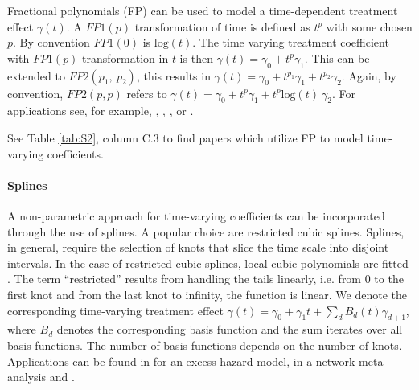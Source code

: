 
\noindent Fractional polynomials (FP) can be used to model a time-dependent treatment effect $\gamma \left(t\right)$. A $FP1(p)$ transformation of time is defined as $t^p$ with some chosen $p$. By convention $FP1(0)$ is $\mathrm{log}\mathrm{}(t)$. The time varying treatment coefficient with $FP1(p)$ transformation in $t$ is then $\gamma \left(t\right)={\gamma }_0+t^p{\gamma }_1$. This can be extended to $FP2(p_1,\ p_2)$, this results in $\gamma \left(t\right)={\gamma }_0+t^{p_1}{\gamma }_1+t^{p_2}{\gamma }_2$. Again, by convention, $FP2(p,p)$ refers to $\gamma \left(t\right)={\gamma }_0+t^p{\gamma }_1+t^p{\mathrm{log} (t)\ }{\gamma }_2$. For applications see, for example, \cite{Berger.2003}, \cite{Austin.2022}, \cite{Freeman.2022}, or \cite{Sauerbrei.2007}. 

\noindent See Table \ref{tab:S2}, column C.3 to find papers which utilize FP to model time-varying coefficients.

\noindent 


\paragraph{Splines} \label{Splines}

\noindent 


\noindent A non-parametric approach for time-varying coefficients can be incorporated through the use of splines. A popular choice are restricted cubic splines. Splines, in general, require the selection of knots that slice the time scale into disjoint intervals. In the case of restricted cubic splines, local cubic polynomials are fitted \cite{Hess.1994}. The term ``restricted'' results from handling the tails linearly, i.e. from $0$ to the first knot and from the last knot to infinity, the function is linear. We denote the corresponding time-varying treatment effect $\gamma \left(t\right)={\gamma }_0+{\gamma }_1t+\sum_d{B_d\left(t\right){\gamma }_{d+1}}$, where $B_d$ denotes the corresponding basis function and the sum iterates over all basis functions. The number of basis functions depends on the number of knots. Applications can be found in \cite{Bolard.2002} for an excess hazard model, \cite{Freeman.2022} in a network meta-analysis and \cite{Austin.2022}.

\noindent 

